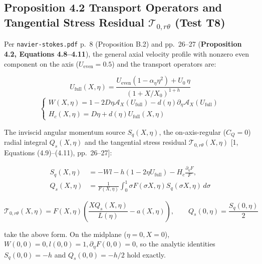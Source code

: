 \documentclass[12pt,a4paper]{article}
\begin{document}
\subsection{Proposition 4.2 Transport Operators and Tangential Stress Residual $\mathcal{T}_{0, r\theta}$ (Test T8)}

Per \texttt{navier-stokes.pdf} p.\ 8 (Proposition B.2) and pp.\ 26--27 (\textbf{Proposition 4.2, Equations 4.8--4.11}), the general axial velocity profile with nonzero even component on the axis ($U_{\mathrm{even}} = 0.5$) and the transport operators are:

\begin{equation}
U_{\mathrm{full}}(X, \eta) = \frac{U_{\mathrm{even}}(1 - \alpha_\eta \eta^2) + U_0 \, \eta}{(1 + X / X_0)^{1 + h}}
\end{equation}
\begin{equation}
\begin{cases}
W(X, \eta) = 1 - 2D\eta \mathcal{A}_X(U_{\mathrm{full}}) - d(\eta) \partial_\eta \mathcal{A}_X(U_{\mathrm{full}}) \\
H_c(X, \eta) = D\eta + d(\eta) U_{\mathrm{full}}(X, \eta)
\end{cases}
\end{equation}

The inviscid angular momentum source $S_q(X, \eta)$, the on-axis-regular ($C_Q = 0$) radial integral $Q_s(X, \eta)$ and the tangential stress residual $\mathcal{T}_{0, r\theta}(X, \eta)$ [1, Equations (4.9)--(4.11), pp.\ 26--27]:

\begin{equation}
\begin{split}
S_q(X, \eta) &= -W l - h(1 - 2\eta U_{\mathrm{full}}) - H_c \frac{\partial_\eta F}{F}, \\
Q_s(X, \eta) &= \frac{1}{F(X, \eta)} \int_0^1 \sigma F(\sigma X, \eta) S_q(\sigma X, \eta) \, d\sigma
\end{split}
\end{equation}

\begin{equation}
\mathcal{T}_{0, r\theta}(X, \eta) = F(X, \eta) \left( \frac{X Q_s(X, \eta)}{L(\eta)} - a(X, \eta) \right), \qquad Q_s(0, \eta) = \frac{S_q(0, \eta)}{2}
\end{equation}

take the above form. On the midplane ($\eta = 0, X = 0$), $W(0,0) = 0, l(0,0) = 1, \partial_\eta F(0,0) = 0$, so the analytic identities $S_q(0,0) = -h$ and $Q_s(0,0) = -h/2$ hold exactly.
\end{document}
